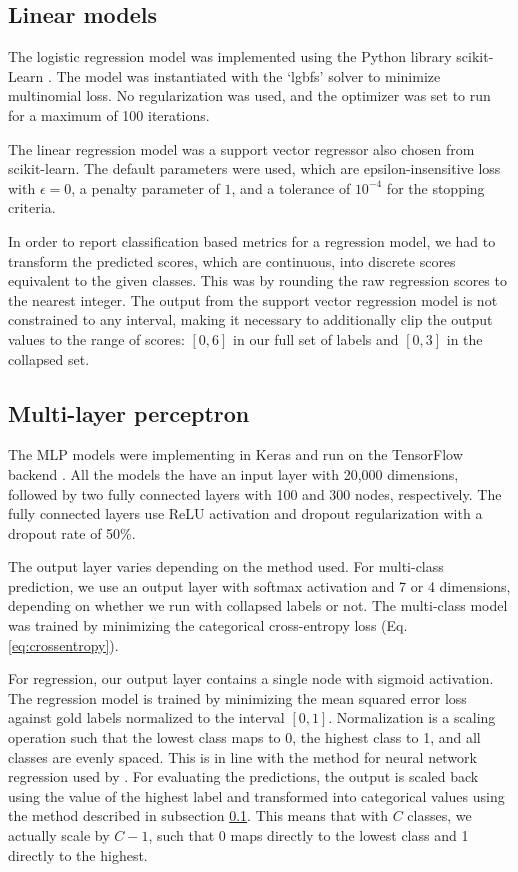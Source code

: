 \subsection{Linear models}
\label{subsec:linear}

The logistic regression model was implemented using the Python library
scikit-Learn \autocite{scikit-learn}. The model was instantiated with the
`lgbfs' solver to minimize multinomial loss. No regularization was used, and
the optimizer was set to run for a maximum of 100 iterations.

The linear regression model was a support vector regressor also chosen from
scikit-learn. The default parameters were used, which are epsilon-insensitive
loss with $\epsilon=0$, a penalty parameter of $1$, and a tolerance of
$10^{-4}$ for the stopping criteria.

In order to report classification based metrics for a regression model, we
had to transform the predicted scores, which are continuous, into discrete
scores equivalent to the given classes. This was by rounding the raw
regression scores to the nearest integer. The output from the support vector
regression model is not constrained to any interval, making it necessary to
additionally clip the output values to the range of scores: $[0,6]$ in our
full set of labels and $[0,3]$ in the collapsed set.


\subsection{Multi-layer perceptron}
\label{subsec:mlp}

The MLP models were implementing in Keras \autocite{keras} and run on the
TensorFlow backend \autocite{tensorflow}. All the models the have an input
layer with 20,000 dimensions, followed by two fully connected layers with 100
and 300 nodes, respectively. The fully connected layers use \ac{ReLU}
activation and dropout regularization with a dropout rate of 50\%.

The output layer varies depending on the method used. For multi-class
prediction, we use an output layer with softmax activation and 7 or 4
dimensions, depending on whether we run with collapsed labels or not. The
multi-class model was trained by minimizing the categorical cross-entropy
loss (Eq. \ref{eq:crossentropy}).

For regression, our output layer contains a single node with sigmoid
activation. The regression model is trained by minimizing the mean squared
error loss against gold labels normalized to the interval $[0, 1]$.
Normalization is a scaling operation such that the lowest class maps to 0,
the highest class to 1, and all classes are evenly spaced. This is in line
with the method for neural network regression used by \textcite{taghipour16}.
For evaluating the predictions, the output is scaled back using the value of
the highest label and transformed into categorical values using the method
described in subsection \ref{subsec:linear}. This means that with $C$ classes,
we actually scale by $C-1$, such that 0 maps directly to the lowest class and
1 directly to the highest.

